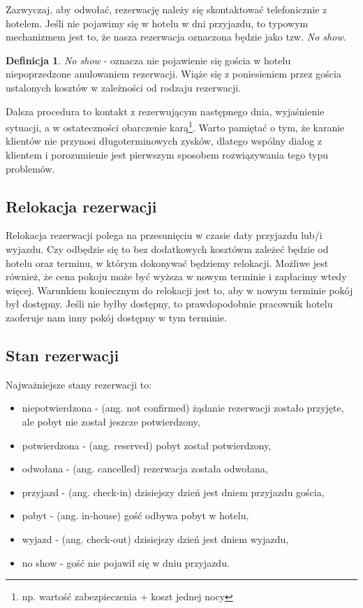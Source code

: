 \documentclass[a4paper,onecolumn,oneside,11pt,wide,floatssmall]{mwrep}
\theoremstyle{definition}
\newtheorem{defn}{Definicja}[section]
\theoremstyle{plain}%
\theoremstyle{remark}
\begin{document}
Zazwyczaj, aby odwołać, rezerwację należy się skontaktować telefonicznie z 
hotelem. Jeśli nie pojawimy się w hotelu w dni przyjazdu, to typowym mechanizmem jest 
to, że nasza rezerwacja oznaczona będzie jako tzw. \emph{No show}. 

\begin{defn}{\emph{No show}}
- oznacza nie pojawienie się gościa w hotelu niepoprzedzone anulowaniem rezerwacji. 
Wiąże się z poniesieniem przez gościa ustalonych kosztów w zależności od 
rodzaju rezerwacji.
\end{defn}

Dalsza procedura to kontakt z rezerwującym następnego dnia, wyjaśnienie 
sytuacji, a w ostateczności obarczenie karą\footnote{np. wartość zabezpieczenia 
+ koszt jednej nocy}. Warto pamiętać o tym, że karanie klientów nie przynosi 
długoterminowych zysków, dlatego wspólny dialog z klientem i porozumienie 
jest pierwszym sposobem rozwiązywania tego typu problemów.

\subsection{Relokacja rezerwacji}
Relokacja rezerwacji polega na przesunięciu w czasie daty przyjazdu lub/i 
wyjazdu. Czy odbędzie się to bez dodatkowych kosztówm zależeć będzie od 
hotelu oraz terminu, w którym dokonywać będziemy relokacji. Możliwe jest 
również, że cena pokoju może być wyższa w nowym terminie i zapłacimy wtedy 
więcej. Warunkiem koniecznym do relokacji jest to, aby w nowym terminie 
pokój był dostępny. Jeśli nie byłby dostępny, to prawdopodobnie pracownik 
hotelu zaoferuje nam inny pokój dostępny w 
tym terminie.

\subsection{Stan rezerwacji}
\label{chap1:stany-rezerwacji}
Najważniejsze stany rezerwacji to:
\begin{itemize}
  \item niepotwierdzona - (ang. not confirmed) żądanie rezerwacji zostało 
  przyjęte, ale pobyt nie został jeszcze potwierdzony,
  \item potwierdzona - (ang. reserved) pobyt został potwierdzony,
  \item odwołana - (ang. cancelled) rezerwacja została odwołana,
  \item przyjazd - (ang. check-in) dzisiejszy dzień jest dniem przyjazdu 
  gościa,
  \item pobyt - (ang. in-house) gość odbywa pobyt w hotelu,
  \item wyjazd - (ang. check-out) dzisiejszy dzień jest dniem wyjazdu,
  \item no show - gość nie pojawił się w dniu przyjazdu.
\end{itemize}
\end{document}
